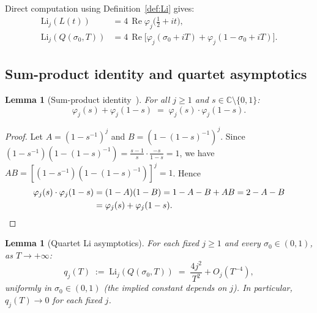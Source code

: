 \documentclass[12pt]{amsart}
\theoremstyle{definition}
\theoremstyle{remark}
\theoremstyle{plain}
\newtheorem{lemma}[definition]{Lemma}
\newcommand{\Li}{\mathrm{Li}}
\newcommand{\re}{\operatorname{Re}}
\newcommand{\CC}{\mathbb{C}}
\begin{document}
Direct computation using Definition~\ref{def:Li} gives:
\begin{align}
  \Li_j(L(t)) &= 4\,\re\varphi_j\!\bigl({\textstyle\frac12}+it\bigr),
                \label{eq:Lionline}\\
  \Li_j(Q(\sigma_0,T))
    &= 4\,\re\bigl[\varphi_j(\sigma_0+iT)
       + \varphi_j(1{-}\sigma_0+iT)\bigr].
    \label{eq:Lioffl}
\end{align}

\subsection{Sum-product identity and quartet asymptotics}

\begin{lemma}[Sum-product identity~{\cite{BombieriLagarias1999}}]
For all $j \geq 1$ and $s \in \CC \setminus \{0,1\}$:
\[
  \varphi_j(s) + \varphi_j(1-s) \;=\; \varphi_j(s)\cdot\varphi_j(1-s).
\]
\end{lemma}

\begin{proof}
Let $A=(1-s^{-1})^j$ and $B=(1-(1-s)^{-1})^j$.
Since $(1-s^{-1})(1-(1-s)^{-1}) = \tfrac{s-1}{s}\cdot\tfrac{-s}{1-s} = 1$,
we have $AB = [(1-s^{-1})(1-(1-s)^{-1})]^j = 1$.  Hence
\begin{align*}
  \varphi_j(s)\cdot\varphi_j(1-s)
  &= (1-A)(1-B) = 1 - A - B + AB = 2 - A - B\\
  &= \varphi_j(s) + \varphi_j(1-s).\qedhere
\end{align*}
\end{proof}

\begin{lemma}[Quartet Li asymptotics]
\label{lem:qasympt}
For each fixed $j\ge 1$ and every $\sigma_0\in(0,1)$, as $T\to+\infty$:
\begin{equation}
  \label{eq:djasympt}
  q_j(T) \;:=\; \Li_j(Q(\sigma_0,T)) \;=\; \frac{4j^2}{T^2} + O_j(T^{-4}),
\end{equation}
uniformly in $\sigma_0\in(0,1)$ (the implied constant depends on $j$).
In particular, $q_j(T) \to 0$ for each fixed $j$.
\end{lemma}
\end{document}
